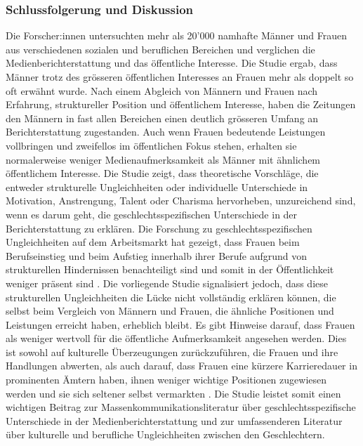 \subsubsection{Schlussfolgerung und Diskussion}
Die Forscher:innen untersuchten mehr als 20'000 namhafte Männer und Frauen aus verschiedenen sozialen und 
beruflichen Bereichen und verglichen die Medienberichterstattung und das öffentliche Interesse. 
Die Studie ergab, dass Männer trotz des grösseren öffentlichen Interesses an Frauen mehr als doppelt so oft erwähnt wurde. 
Nach einem Abgleich von Männern und Frauen nach Erfahrung, struktureller Position und öffentlichem Interesse, 
haben die Zeitungen den Männern in fast allen Bereichen einen deutlich grösseren Umfang an Berichterstattung zugestanden. 
Auch wenn Frauen bedeutende Leistungen vollbringen und zweifellos im öffentlichen Fokus stehen, erhalten sie normalerweise 
weniger Medienaufmerksamkeit als Männer mit ähnlichem öffentlichem Interesse.
Die Studie zeigt, dass theoretische Vorschläge, die entweder strukturelle Ungleichheiten oder individuelle 
Unterschiede in Motivation, Anstrengung, Talent oder Charisma hervorheben, unzureichend sind, wenn es darum 
geht, die geschlechtsspezifischen Unterschiede in der Berichterstattung zu erklären. 
Die Forschung zu geschlechtsspezifischen Ungleichheiten auf dem Arbeitsmarkt hat gezeigt, dass Frauen beim 
Berufseinstieg und beim Aufstieg innerhalb ihrer Berufe aufgrund von strukturellen Hindernissen benachteiligt 
sind und somit in der Öffentlichkeit weniger präsent sind \cite{glass_ceiling_effect,glass_ceiling_politics,president_glass_ceiling}. 
Die vorliegende Studie signalisiert jedoch, dass diese strukturellen Ungleichheiten die Lücke nicht vollständig 
erklären können, die selbst beim Vergleich von Männern und Frauen, die ähnliche Positionen und Leistungen 
erreicht haben, erheblich bleibt. 
Es gibt Hinweise darauf, dass Frauen als weniger wertvoll für die öffentliche Aufmerksamkeit angesehen werden. 
Dies ist sowohl auf kulturelle Überzeugungen zurückzuführen, die Frauen und ihre Handlungen 
abwerten, als auch darauf, dass Frauen eine kürzere Karrieredauer in prominenten Ämtern haben, ihnen 
weniger wichtige Positionen zugewiesen werden und sie sich seltener selbst vermarkten \cite{status_matters_for_inequality,social_difference_status_distinction}. 
Die Studie leistet somit einen wichtigen Beitrag zur Massenkommunikationsliteratur über geschlechtsspezifische 
Unterschiede in der Medienberichterstattung und zur umfassenderen Literatur über kulturelle und berufliche 
Ungleichheiten zwischen den Geschlechtern.
